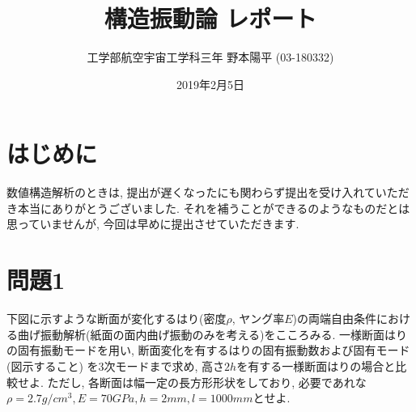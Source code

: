 \documentclass[12pt]{jsarticle}
\title{\Huge{構造振動論 レポート}}
\author{\LARGE{工学部航空宇宙工学科三年 野本陽平 (03-180332)}}
\date{\large{2019年2月5日}}
\begin{document}
\maketitle
\newpage
\section*{はじめに}
数値構造解析のときは, 提出が遅くなったにも関わらず提出を受け入れていただき本当にありがとうございました. それを補うことができるのようなものだとは思っていませんが, 今回は早めに提出させていただきます.
\section*{問題1}
下図に示すような断面が変化するはり(密度$\rho$, ヤング率$E$)の両端自由条件における曲げ振動解析(紙面の面内曲げ振動のみを考える)をこころみる. 一様断面はりの固有振動モードを用い, 断面変化を有するはりの固有振動数および固有モード(図示すること) を3次モードまで求め, 高さ$2h$を有する一様断面はりの場合と比較せよ. ただし, 各断面は幅一定の長方形形状をしており, 必要であれな$\rho=2.7g/cm^3, E=70GPa, h=2mm, l=1000mm$とせよ.
\end{document}
